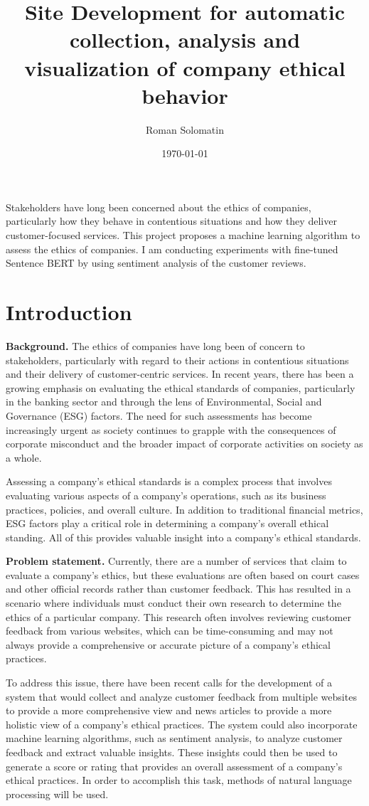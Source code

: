 \documentclass[PI]{ProjectProposal}
\author{Roman Solomatin}
\date{\today}
\title{Site Development for automatic collection, analysis and visualization of company ethical behavior}
\begin{document}
\maketitle
Stakeholders have long been concerned about the ethics of companies, particularly how they behave in contentious situations and how they deliver customer-focused services. This project proposes a machine learning algorithm to assess the ethics of companies. I am conducting experiments with fine-tuned Sentence BERT by using sentiment analysis of the customer reviews.

\chapter{Introduction}
\label{sec:org5f658f7}
\textbf{Background.} The ethics of companies have long been of concern to stakeholders, particularly with regard to their actions in contentious situations and their delivery of customer-centric services. In recent years, there has been a growing emphasis on evaluating the ethical standards of companies, particularly in the banking sector and through the lens of Environmental, Social and Governance (ESG) factors\autocites{mure_esg_2021}[][]{miralles-quiros_esg_2019}[][]{climent_ethical_2018}. The need for such assessments has become increasingly urgent as society continues to grapple with the consequences of corporate misconduct and the broader impact of corporate activities on society as a whole.

Assessing a company's ethical standards is a complex process that involves evaluating various aspects of a company's operations, such as its business practices, policies, and overall culture. In addition to traditional financial metrics, ESG factors play a critical role in determining a company's overall ethical standing. All of this provides valuable insight into a company's ethical standards.

\textbf{Problem statement.} Currently, there are a number of services that claim to evaluate a company's ethics, but these evaluations are often based on court cases and other official records rather than customer feedback. This has resulted in a scenario where individuals must conduct their own research to determine the ethics of a particular company. This research often involves reviewing customer feedback from various websites, which can be time-consuming and may not always provide a comprehensive or accurate picture of a company's ethical practices.

To address this issue, there have been recent calls for the development of a system that would collect and analyze customer feedback from multiple websites to provide a more comprehensive view and news articles to provide a more holistic view of a company's ethical practices. The system could also incorporate machine learning algorithms, such as sentiment analysis, to analyze customer feedback and extract valuable insights. These insights could then be used to generate a score or rating that provides an overall assessment of a company's ethical practices. In order to accomplish this task, methods of natural language processing will be used.
\end{document}
